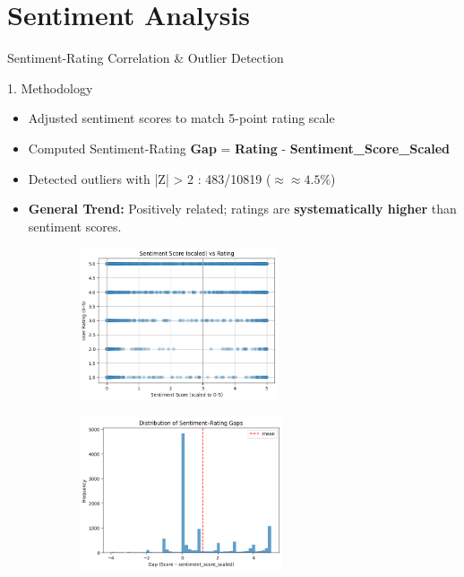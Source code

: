 \section{Sentiment Analysis}

\begin{frame}{Sentiment-Rating Correlation \& Outlier Detection}
    
	\begin{block}{1. Methodology}
		\scriptsize
		\begin{itemize}
			\item Adjusted sentiment scores to match 5-point rating scale
			\item Computed Sentiment-Rating \textbf{Gap} = \textbf{Rating} - \textbf{Sentiment\_Score\_Scaled}
			\item Detected outliers with |Z| > 2 : 483/10819 ($ \approx ≈ 4.5\%$)
			\item \textbf{General Trend:} Positively related; ratings are \textbf{systematically higher} than sentiment scores. 
		\end{itemize}
	\end{block}
    
	\vspace{-20pt}
	\begin{figure}[htbp]
		\centering
		\begin{minipage}[t]{0.50\textwidth}
			\vspace{0pt}
			\centering
			\begin{figure}
				\centering
					\includegraphics[height=4.5cm]{pic/sentiment_1.png}
			\end{figure}
		\end{minipage}
		\hfill
		\begin{minipage}[t]{0.49\textwidth}
			\vspace{0pt}
			\centering
			\begin{figure}
				\centering
					\includegraphics[height=4.5cm]{pic/sentiment_2.png}
			\end{figure}
		\end{minipage}
	\end{figure}

\end{frame}


